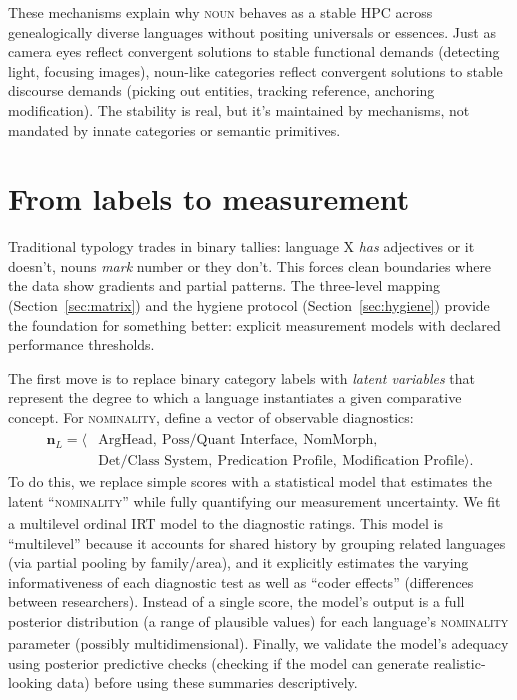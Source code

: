 \documentclass[12pt]{article}
\newcommand{\term}[1]{\textit{#1}}
\begin{document}
These mechanisms explain why \textsc{noun} behaves as a stable HPC across genealogically diverse languages without positing universals or essences. Just as camera eyes reflect convergent solutions to stable functional demands (detecting light, focusing images), noun-like categories reflect convergent solutions to stable discourse demands (picking out entities, tracking reference, anchoring modification). The stability is real, but it's maintained by mechanisms, not mandated by innate categories or semantic primitives.

\section{From labels to measurement}\label{sec:measurement}
Traditional typology trades in binary tallies: language X \term{has} adjectives or it doesn't, nouns \term{mark} number or they don't. This forces clean boundaries where the data show gradients and partial patterns. The three-level mapping (Section~\ref{sec:matrix}) and the hygiene protocol (Section~\ref{sec:hygiene}) provide the foundation for something better: explicit measurement models with declared performance thresholds.

The first move is to replace binary category labels with \emph{latent variables} that represent the degree to which a language instantiates a given comparative concept. For \textsc{nominality}\textsubscript{\Cross}, define a vector of observable diagnostics:
\[
  \begin{aligned}
  \mathbf{n}_L = \big\langle
     &\text{ArgHead},\ \text{Poss/Quant Interface},\ \text{NomMorph},\\
     &\text{Det/Class System},\ \text{Predication Profile},\ \text{Modification Profile}
  \big\rangle.
  \end{aligned}
\]
To do this, we replace simple scores with a statistical model that estimates the latent \enquote{\textsc{nominality}\textsubscript{\Cross}} while fully quantifying our measurement uncertainty. We fit a multilevel ordinal IRT model to the diagnostic ratings. This model is \enquote{multilevel} because it accounts for shared history by grouping related languages (via partial pooling by family/area), and it explicitly estimates the varying informativeness of each diagnostic test as well as \enquote{coder effects} (differences between researchers). Instead of a single score, the model's output is a full posterior distribution (a range of plausible values) for each language's \textsc{nominality}\textsubscript{\Cross} parameter (possibly multidimensional). Finally, we validate the model's adequacy using posterior predictive checks (checking if the model can generate realistic-looking data) before using these summaries descriptively.
\end{document}
